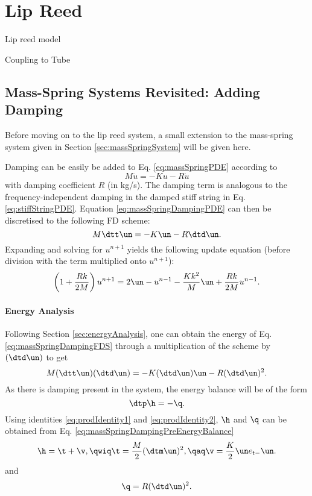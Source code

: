 \chapter{Lip Reed}\label{ch:lipreed}
Lip reed model



Coupling to Tube

\section{Mass-Spring Systems Revisited: Adding Damping}\label{sec:massSpringDamping}
Before moving on to the lip reed system, a small extension to the mass-spring system given in Section \ref{sec:massSpringSystem} will be given here. 

Damping can be easily be added to Eq. \eqref{eq:massSpringPDE} according to 
\begin{equation}\label{eq:massSpringDampingPDE}
    M\ddot u = -Ku - R\dot u
\end{equation}
with damping coefficient $R$ (in kg/s). The damping term is analogous to the frequency-independent damping in the damped stiff string in Eq. \eqref{eq:stiffStringPDE}. Equation \eqref{eq:massSpringDampingPDE} can then be discretised to the following FD scheme:
\begin{equation}\label{eq:massSpringDampingFDS}
    M\dtt \un = -K\un - R\dtd \un.
\end{equation}
Expanding and solving for $u^{n+1}$ yields the following update equation (before division with the term multiplied onto $u^{n+1}$):
\begin{equation}\label{eq:massSpringDampingUpdate}
    \left(1+\frac{Rk}{2M}\right)u^{n+1} = 2 \un - u^{n-1} - \frac{Kk^2}{M}\un + \frac{Rk}{2M}u^{n-1}.
\end{equation}
\subsubsection{Energy Analysis}
Following Section \ref{sec:energyAnalysis}, one can obtain the energy of Eq. \eqref{eq:massSpringDampingFDS} through a multiplication of the scheme by $(\dtd \un)$ to get
\begin{equation}\label{eq:massSpringDampingPreEnergyBalance}
    M(\dtt \un)(\dtd \un) = -K(\dtd \un)\un - R(\dtd \un)^2.
\end{equation}
As there is damping present in the system, the energy balance will be of the form 
\begin{equation*}
    \dtp \h = -\q.
\end{equation*}
Using identities \eqref{eq:prodIdentity1} and \eqref{eq:prodIdentity2}, $\h$ and $\q$ can be obtained from Eq. \eqref{eq:massSpringDampingPreEnergyBalance} 
\begin{equation}\label{eq:energyBalanceMassSpringDamper}
    \h = \t + \v, \qwiq
    \t = \frac{M}{2}(\dtm\un)^2, \qaq \v = \frac{K}{2}\un e_{t-}\un.
\end{equation} 
and
\begin{equation}\label{eq:massDampingEnergy}
    \q = R(\dtd \un)^2.
\end{equation}


